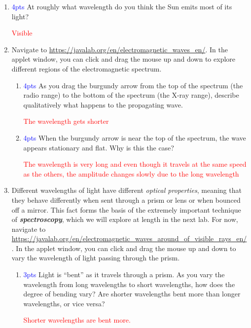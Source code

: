 \documentclass[11pt]{article}
\begin{document}
\begin{enumerate}
    \item \textcolor{blue}{4pts} At roughly what wavelength do you think the Sun emits most of its light?
    
    \textcolor{red}{Visible}
    
    \item Navigate to \url{https://javalab.org/en/electromagnetic_waves_en/}. In the applet window, you can click and drag the mouse up and down to explore different regions of the electromagnetic spectrum.
    \begin{enumerate}
        \item \textcolor{blue}{4pts} As you drag the burgundy arrow from the top of the spectrum (the radio range) to the bottom of the spectrum (the X-ray range), describe qualitatively what happens to the propagating wave.
        
        \textcolor{red}{The wavelength gets shorter}
        
        \item \textcolor{blue}{4pts} When the burgundy arrow is near the top of the spectrum, the wave appears stationary and flat. Why is this the case?
        
        \textcolor{red}{The wavelength is very long and even though it travels at the same speed as the others, the amplitude changes slowly due to the long wavelength}
    \end{enumerate}
    
    \item Different wavelengths of light have different \emph{optical properties}, meaning that they behave differently when sent through a prism or lens or when bounced off a mirror. This fact forms the basis of the extremely important technique of \textbf{\emph{spectroscopy}}, which we will explore at length in the next lab. For now, navigate to \url{https://javalab.org/en/electromagnetic_waves_around_of_visible_rays_en/}. In the applet window, you can click and drag the mouse up and down to vary the wavelength of light passing through the prism.
    \begin{enumerate}
        \item \textcolor{blue}{3pts} Light is ``bent'' as it travels through a prism. As you vary the wavelength from long wavelengths to short wavelengths, how does the degree of bending vary? Are shorter wavelengths bent more than longer wavelengths, or vice versa?
        
        \textcolor{red}{Shorter wavelengths are bent more.}
        

\end{enumerate}
\end{enumerate}
\end{document}
